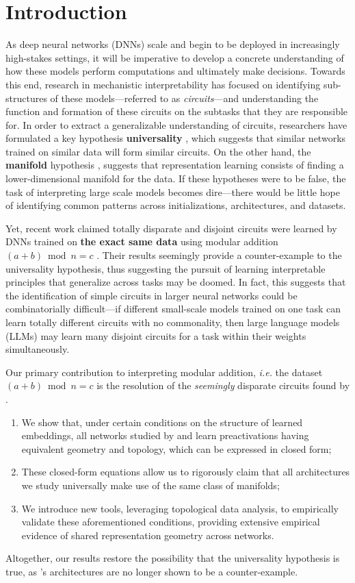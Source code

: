 \section{Introduction}
As deep neural networks (DNNs) scale and begin to be deployed in increasingly high-stakes settings, it will be imperative to develop a concrete understanding of how these models perform computations and ultimately make decisions.
Towards this end, research in mechanistic interpretability has focused on identifying sub-structures of these models---referred to as \emph{circuits}---and understanding the function and formation of these circuits on the subtasks that they are responsible for.
In order to extract a generalizable understanding of circuits, researchers have formulated a key hypothesis \textbf{universality} \citep{li2015convergent, olah2020zoom}, which suggests that similar networks trained on similar data will form similar circuits. On the other hand, the \textbf{manifold} hypothesis \citep{bengio2013representation, goodfellow2016deep}, suggests that representation learning consists of finding a lower-dimensional manifold for the data. If these hypotheses were to be false, the task of interpreting large scale models becomes dire---there would be little hope of identifying common patterns across initializations, architectures, and datasets.

Yet, recent work claimed totally disparate and disjoint circuits were learned by DNNs trained on \textbf{the exact same data} using modular addition $(a+b)\bmod n = c$ \citep{zhong2023the}. Their results seemingly provide a counter-example to the universality hypothesis, thus suggesting the pursuit of learning interpretable principles that generalize across tasks may be doomed. In fact, this suggests that the identification of simple circuits in larger neural networks could be combinatorially difficult---if different small-scale models trained on one task can learn totally different circuits with no commonality, then large language models (LLMs) may learn many disjoint circuits for a task within their weights simultaneously. 

Our primary contribution to interpreting modular addition, \textit{i.e.} the dataset $(a+b)\bmod n = c$ is the resolution of the \textit{seemingly} disparate circuits found by \cite{zhong2023the}.

\begin{enumerate}
    \item We show that, under certain conditions on the structure of learned embeddings, all networks studied by \citet{zhong2023the} and \citet{mccracken2025uncoveringuniversalabstractalgorithm} learn preactivations having equivalent geometry and topology, which can be expressed in closed form;
    \item These closed-form equations allow us to rigorously claim that all architectures we study universally make use of the same class of manifolds;
    \item We introduce new tools, leveraging topological data analysis, to empirically validate these aforementioned conditions, providing extensive empirical evidence of shared representation geometry across networks.
\end{enumerate}


Altogether, our results restore the possibility that the universality hypothesis is true, as \cite{zhong2023the}'s architectures are no longer shown to be a counter-example. 
